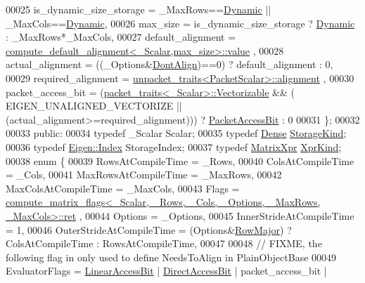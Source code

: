 \begin{DoxyCode}
00025       is\_dynamic\_size\_storage = \_MaxRows==\hyperlink{namespace_eigen_ad81fa7195215a0ce30017dfac309f0b2}{Dynamic} || \_MaxCols==\hyperlink{namespace_eigen_ad81fa7195215a0ce30017dfac309f0b2}{Dynamic},
00026       max\_size = is\_dynamic\_size\_storage ? \hyperlink{namespace_eigen_ad81fa7195215a0ce30017dfac309f0b2}{Dynamic} : \_MaxRows*\_MaxCols,
00027       default\_alignment = \hyperlink{struct_eigen_1_1internal_1_1compute__default__alignment}{compute\_default\_alignment<\_Scalar,max\_size>::value}
      ,
00028       actual\_alignment = ((\_Options&\hyperlink{group__enums_ggaacded1a18ae58b0f554751f6cdf9eb13a40a452614141522dd313363dbbd65726}{DontAlign})==0) ? default\_alignment : 0,
00029       required\_alignment = \hyperlink{struct_eigen_1_1internal_1_1unpacket__traits}{unpacket\_traits<PacketScalar>::alignment}
      ,
00030       packet\_access\_bit = (\hyperlink{struct_eigen_1_1internal_1_1packet__traits}{packet\_traits<\_Scalar>::Vectorizable} && (
      EIGEN\_UNALIGNED\_VECTORIZE || (actual\_alignment>=required\_alignment))) ? 
      \hyperlink{group__flags_ga1a306a438e1ab074e8be59512e887b9f}{PacketAccessBit} : 0
00031     \};
00032     
00033 \textcolor{keyword}{public}:
00034   \textcolor{keyword}{typedef} \_Scalar Scalar;
00035   \textcolor{keyword}{typedef} \hyperlink{struct_eigen_1_1_dense}{Dense} \hyperlink{struct_eigen_1_1_dense}{StorageKind};
00036   \textcolor{keyword}{typedef} \hyperlink{namespace_eigen_a62e77e0933482dafde8fe197d9a2cfde}{Eigen::Index} StorageIndex;
00037   \textcolor{keyword}{typedef} \hyperlink{struct_eigen_1_1_matrix_xpr}{MatrixXpr} \hyperlink{struct_eigen_1_1_matrix_xpr}{XprKind};
00038   \textcolor{keyword}{enum} \{
00039     RowsAtCompileTime = \_Rows,
00040     ColsAtCompileTime = \_Cols,
00041     MaxRowsAtCompileTime = \_MaxRows,
00042     MaxColsAtCompileTime = \_MaxCols,
00043     Flags = 
      \hyperlink{class_eigen_1_1internal_1_1compute__matrix__flags}{compute\_matrix\_flags<\_Scalar, \_Rows, \_Cols, \_Options, \_MaxRows, \_MaxCols>::ret}
      ,
00044     Options = \_Options,
00045     InnerStrideAtCompileTime = 1,
00046     OuterStrideAtCompileTime = (Options&\hyperlink{group__enums_ggaacded1a18ae58b0f554751f6cdf9eb13acfcde9cd8677c5f7caf6bd603666aae3}{RowMajor}) ? ColsAtCompileTime : RowsAtCompileTime,
00047     
00048     \textcolor{comment}{// FIXME, the following flag in only used to define NeedsToAlign in PlainObjectBase}
00049     EvaluatorFlags = \hyperlink{group__flags_ga4b983a15d57cd55806df618ac544d09e}{LinearAccessBit} | \hyperlink{group__flags_gabf1e9d0516a933445a4c307ad8f14915}{DirectAccessBit} | packet\_access\_bit | 

\end{DoxyCode}
